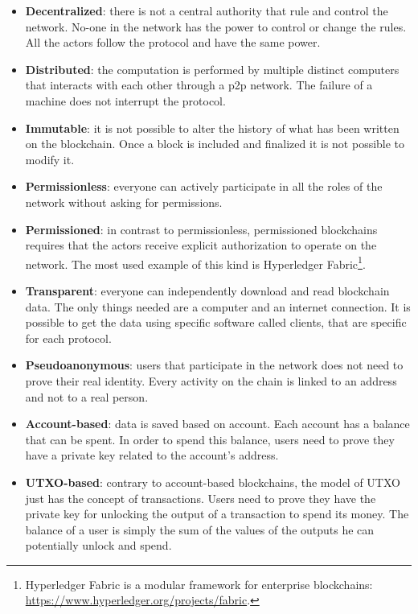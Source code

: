 \begin{itemize}
    \item \textbf{Decentralized}: there is not a central authority that rule and control the network. No-one in the network has the power to control or change the rules. All the actors follow the protocol and have the same power.
    \item \textbf{Distributed}: the computation is performed by multiple distinct computers that interacts with each other through a p2p network. The failure of a machine does not interrupt the protocol.
    \item \textbf{Immutable}: it is not possible to alter the history of what has been written on the blockchain. Once a block is included and finalized it is not possible to modify it.
    \item \textbf{Permissionless}: everyone can actively participate in all the roles of the network without asking for permissions.
    \item \textbf{Permissioned}: in contrast to permissionless, permissioned blockchains requires that the actors receive explicit authorization to operate on the network. The most used example of this kind is Hyperledger Fabric\footnote{Hyperledger Fabric is a modular framework for enterprise blockchains: \url{https://www.hyperledger.org/projects/fabric}.}.
    \item \textbf{Transparent}: everyone can independently download and read blockchain data. The only things needed are a computer and an internet connection. It is possible to get the data using specific software called clients, that are specific for each protocol.
    \item \textbf{Pseudoanonymous}: users that participate in the network does not need to prove their real identity. Every activity on the chain is linked to an address and not to a real person. 
    \item \textbf{Account-based}: data is saved based on account. Each account has a balance that can be spent. In order to spend this balance, users need to prove they have a private key related to the account's address.
    \item \textbf{UTXO-based}: contrary to account-based blockchains, the model of UTXO just has the concept of transactions. Users need to prove they have the private key for unlocking the output of a transaction to spend its money. The balance of a user is simply the sum of the values of the outputs he can potentially unlock and spend.
\end{itemize}

